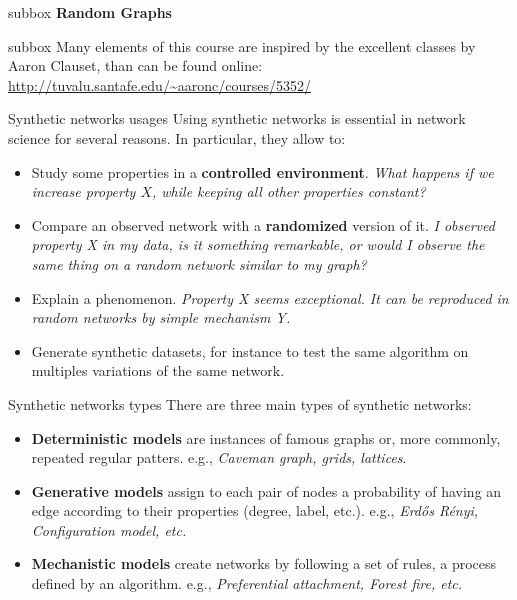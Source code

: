 \begin{subbox}{subbox}{}
    \centering
    \Large{\textbf{Random Graphs}}
\end{subbox}


\begin{subbox}{subbox}{}
    \centering
    Many elements of this course are inspired by the excellent classes by Aaron Clauset, than can be found online:  \url{ http://tuvalu.santafe.edu/~aaronc/courses/5352/}  
\end{subbox}


\begin{textbox}{Synthetic networks usages}
    Using synthetic networks is essential in network science for several reasons. In particular, they allow to:
    \begin{itemize}
        \item Study some properties in a \textbf{controlled environment}. \textit{What happens if we increase property $X$, while keeping all other properties constant?}
        \item Compare an observed network with a \textbf{randomized} version of it. \textit{I observed property X in my data, is it something remarkable, or would I observe the same thing on a random network similar to my graph?}
        \item Explain a phenomenon. \textit{Property X seems exceptional. It can be reproduced in random networks by simple mechanism Y.}
        \item Generate synthetic datasets, for instance to test the same algorithm on multiples variations of the same network.
    \end{itemize}
\end{textbox}


\begin{textbox}{Synthetic networks types}
    There are three main types of synthetic networks:
    \begin{itemize}
        \item \textbf{Deterministic models} are instances of famous graphs or, more commonly, repeated regular patters. e.g., \textit{Caveman graph, grids, lattices}.
        \item \textbf{Generative models} assign to each pair of nodes a probability of having an edge according to their properties (degree, label, etc.). e.g., \textit{Erdős Rényi, Configuration model, etc.}
        \item \textbf{Mechanistic models} create networks by following a set of rules, a process defined by an algorithm. e.g., \textit{Preferential attachment, Forest fire, etc.}
    \end{itemize}
\end{textbox}


